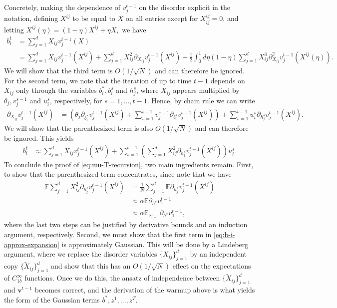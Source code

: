 \documentclass{article}
\newcommand{\1}{\mathbbm{1}}
\theoremstyle{plain}
\theoremstyle{definition}
\theoremstyle{remark}
\newcommand{\E}{\mathbb{E}}
\newcommand{\bfv}{\boldsymbol{v}}
\begin{document}
Concretely, making the dependence of $v_j^{t-1}$ on the disorder explicit in the notation, defining $X^{ij}$ to be equal to $X$ on all entries except for $X^{ij}_{ij}=0$, and letting $X^{ij}(\eta) = (1-\eta)X^{ij} + \eta X,$ we have
\begin{align}
    b_i^t &= \sum_{j=1}^d X_{ij}v_j^{t-1}(X)\nonumber \\
    &= \sum_{j=1}^d X_{ij}v_j^{t-1}(X^{ij}) +  \sum_{j=1}^d X_{ij}^2\partial_{X_{ij}}v_j^{t-1}(X^{ij}) +\frac{1}{2} \int_0^1 d\eta(1-\eta) \sum_{j=1}^d X_{ij}^3 \partial^2_{X_{ij}}v_j^{t-1}(X^{ij}(\eta)).\label{eq:b-i-t-expansion}
\end{align}
We will show that the third term is $O(1/\sqrt{N})$ and can therefore be ignored. For the second term, we note that the iteration of  up to time $t-1$ depends on $X_{ij}$ only through the variables $b^*_i,b_i^s$ and $h_j^s$, where $X_{ij}$ appears multiplied by $\theta_j, v_j^{s-1}$ and $u_i^s$, respectively, for $s=1,\dots,t-1$. Hence, by chain rule we can write
\begin{align*}
    \partial_{X_{ij}}v_j^{t-1}(X^{ij}) &= \left(\theta_j\partial_{b_i^*}v_j^{t-1}(X^{ij}) + \sum_{s=1}^{t-1} v_j^{s-1}\partial_{b_i^s}v_j^{t-1}(X^{ij})\right) +  \sum_{s=1}^{t-1} u_i^{s}\partial_{h_j^s}v_j^{t-1}(X^{ij}).
\end{align*}
We will show that the parenthesized term is also $O(1/\sqrt{N})$ and can therefore be ignored. This yields
\begin{align}\label{eq:b-i-approx-expansion}
    b_i^t &\approx \sum_{j=1}^d X_{ij}v_j^{t-1}(X^{ij}) + \sum_{s=1}^{t-1} \left(\sum_{j=1}^d X_{ij}^2\partial_{h_j^s}v_j^{t-1}(X^{ij})\right) u_i^s .
\end{align}
To conclude the proof of \eqref{eq:mu-T-recursion}, two main ingredients remain. First, to show that the parenthesized term concentrates, since note that we have
\begin{align*}
    \E \sum_{j=1}^d X_{ij}^2\partial_{h_j^s}v_j^{t-1}(X^{ij})&= \frac{1}{N} \sum_{j=1}^d \E\partial_{h_j^s}v_j^{t-1}(X^{ij}) \\
    &\approx \alpha \E\partial_{h_1^s}v_1^{t-1} \\
    &\approx \alpha \E_{\nu_{T-1}}\partial_{h_1^s}v_1^{t-1},
\end{align*}
where the last two steps can be justified by derivative bounds and an induction argument, respectively. Second, we must show that the first term in \eqref{eq:b-i-approx-expansion} is approximately Gaussian. This will be done by a Lindeberg argument, where we replace the disorder variables $\{X_{ij}\}_{j=1}^d$ by an independent copy $\{\tilde{X}_{ij}\}_{j=1}^d$ and show that this has an $O(1/\sqrt{N})$ effect on the expectations of $C^{\infty}_{1b}$ functions. Once we do this, the ansatz of independence between $\{\tilde{X}_{ij}\}_{j=1}^d$ and $\bfv^{t-1}$ becomes correct, and the derivation of the warmup above is what yields the form of the Gaussian terms $b^*,z^1,\dots,z^T.$
\end{document}

